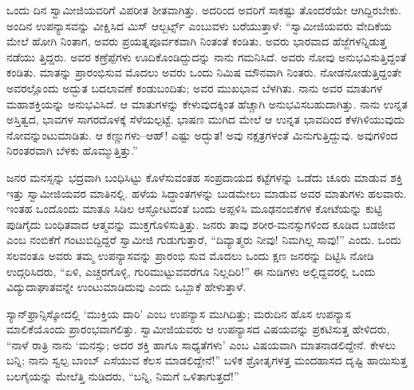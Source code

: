 ಒಂದು ದಿನ ಸ್ವಾಮೀಜಿಯವರಿಗೆ ವಿಪರೀತ ಶೀತವಾಗಿತ್ತು. ಅದರಿಂದ ಅವರಿಗೆ ಸಾಕಷ್ಟು ತೊಂದರೆಯೇ ಆಗಿದ್ದಿರಬೇಕು. ಅಂದಿನ ಉಪನ್ಯಾಸವನ್ನು ವೀಕ್ಷಿಸಿದ ಮಿಸ್ ಆಲ್ಬರ್ಟ್ಸ್ ಎಂಬುವಳು ಬರೆಯುತ್ತಾಳೆ: “ಸ್ವಾಮೀಜಿಯವರು ವೇದಿಕೆಯ ಮೇಲೆ ಹೋಗಿ ನಿಂತಾಗ, ಅವರು ಪ್ರಯತ್ನಪೂರ್ವಕವಾಗಿ ನಿಂತಂತೆ ಕಂಡಿತು. ಅವರು ಭಾರವಾದ ಹೆಜ್ಜೆಗಳನ್ನಿಡುತ್ತ ನಡೆಯು ತ್ತಿದ್ದರು. ಅವರ ಕಣ್ರೆಪ್ಪೆಗಳು ಊದಿಕೊಂಡಿದ್ದುದನ್ನು ನಾನು ಗಮನಿಸಿದೆ. ಅವರು ನೋವು ಅನುಭವಿಸುತ್ತಿದ್ದಂತೆ ಕಂಡಿತು. ಮಾತನ್ನು ಪ್ರಾರಂಭಿಸುವ ಮೊದಲು ಅವರು ಒಂದು ನಿಮಿಷ ಮೌನವಾಗಿ ನಿಂತರು. ನೋಡನೋಡುತ್ತಿದ್ದಂತೇ ಅವರಲ್ಲೊಂದು ಅದ್ಭುತ ಬದಲಾವಣೆ ಕಂಡುಬಂದಿತು; ಅವರ ಮುಖಭಾವ ಬೆಳಗಿತು. ನಾನು ಅವರ ಮಾತುಗಳ ಮಹಾಶಕ್ತಿಯನ್ನು ಅನುಭವಿಸಿದೆ. ಆ ಮಾತುಗಳನ್ನು ಕೇಳುವುದಕ್ಕಿಂತ ಹೆಚ್ಚಾಗಿ ಅನುಭವಿಸಬಹುದಾಗಿತ್ತು. ನಾನು ಉನ್ನತ ಅಸ್ತಿತ್ವದ, ಭಾವಗಳ ಸಾಗರದೊಳಕ್ಕೆ ಸೆಳೆಯಲ್ಪಟ್ಟೆ. ಭಾಷಣ ಮುಗಿದ ಮೇಲೆ ಆ ಉನ್ನತ ಭಾವದಿಂದ ಕೆಳಗಿಳಿಯುವುದು ನೋವನ್ನುಂಟುಮಾಡಿತು. ಆ ಕಣ್ಣುಗಳು–ಆಹ್! ಎಷ್ಟು ಅದ್ಭುತ! ಅವು ನಕ್ಷತ್ರಗಳಂತೆ ಮಿನುಗುತ್ತಿದ್ದುವು. ಅವುಗಳಿಂದ ನಿರಂತರವಾಗಿ ಬೆಳಕು ಹೊಮ್ಮುತ್ತಿತ್ತು.”

ಜನರ ಮನಸ್ಸನ್ನು ಭದ್ರವಾಗಿ ಬಂಧಿಸಿಟ್ಟು ಕೊಳೆಸುವಂತಹ ಸಂಪ್ರದಾಯದ ಕಟ್ಟೆಗಳನ್ನು ಒಡೆದು ಚೂರು ಮಾಡುವ ಶಕ್ತಿ ಇತ್ತು ಸ್ವಾಮೀಜಿಯವರ ಮಾತಿನಲ್ಲಿ. ಹಳೆಯ ಸಿದ್ಧಾಂತಗಳನ್ನು ಬುಡಮೇಲು ಮಾಡುವ ಅವರ ಮಾತುಗಳು ಹಲವಾರು. ಇಂತಹ ಒಂದೊಂದು ಮಾತೂ ಸಿಡಿಲ ಆಸ್ಫೋಟದಂತೆ ಬಂದು ಅಪ್ಪಳಿಸಿ ಮೂಢನಂಬಿಕೆಗಳ ಕೋಟೆಯನ್ನು ಕುಟ್ಟಿ ಪುಡಿಗೈದು ಬಂಧಿತವಾದ ಆತ್ಮವನ್ನು ಮುಕ್ತಗೊಳಿಸುತ್ತಿತ್ತು. ಜನರು ತಾವು ಶರೀರ-ಮನಸ್ಸುಗಳಿಂದ ಕೂಡಿದ ಬಡಜೀವ ಎಂಬ ನಂಬಿಕೆಗೆ ಗಂಟುಬಿದ್ದಿದ್ದರೆ ಸ್ವಾಮೀಜಿ ಗುಡುಗುತ್ತಾರೆ, “ದಿವ್ಯಾತ್ಮರು ನೀವು! ನಿಮಗಿಲ್ಲ ಸಾವು!” ಎಂದು. ಒಂದು ಸಲವಂತೂ ಅವರು ತಮ್ಮ ಉಪನ್ಯಾಸವನ್ನು ಪ್ರಾರಂಭಿ ಸುವ ಮೊದಲು ಒಂದು ಕ್ಷಣ ಜನರನ್ನು ದಿಟ್ಟಿಸಿ ನೋಡಿ ಉದ್ಗರಿಸಿದರು, “ಏಳಿ, ಎಚ್ಚರಗೊಳ್ಳಿ, ಗುರಿಮುಟ್ಟುವವರೆಗೂ ನಿಲ್ಲದಿರಿ!” ಈ ನುಡಿಗಳು ಅಲ್ಲಿದ್ದವರಲ್ಲಿ ಒಂದು ವಿದ್ಯುದಾಘಾತವನ್ನೇ ಉಂಟುಮಾಡಿದುವು ಎಂದು ಒಬ್ಬಾಕೆ ಹೇಳುತ್ತಾಳೆ.

ಸ್ಯಾನ್​ಫ್ರಾನ್ಸಿಸ್ಕೋದಲ್ಲಿ ‘ಮುಕ್ತಿಯ ದಾರಿ’ ಎಂಬ ಉಪನ್ಯಾಸ ಮುಗಿದಿತ್ತು; ಮರುದಿನ ಹೊಸ ಉಪನ್ಯಾಸ ಮಾಲಿಕೆಯೊಂದು ಪ್ರಾರಂಭವಾಗಲಿತ್ತು. ಸ್ವಾಮೀಜಿಯವರು ಆ ಉಪನ್ಯಾಸದ ವಿಷಯವನ್ನು ಪ್ರಕಟಿಸುತ್ತ ಹೇಳಿದರು, “ನಾಳೆ ರಾತ್ರಿ ನಾನು ‘ಮನಸ್ಸು; ಅದರ ಶಕ್ತಿ ಹಾಗೂ ಸಾಧ್ಯತೆಗಳು’ ಎಂಬ ವಿಷಯವಾಗಿ ಮಾತನಾಡಲಿದ್ದೇನೆ. ಕೇಳಲು ಬನ್ನಿ; ನಾನು ಸ್ವಲ್ಪ ಬಾಂಬ್ ಎಸೆಯುವ ಕೆಲಸ ಮಾಡಲಿದ್ದೇನೆ!” ಬಳಿಕ ಶ್ರೋತೃಗಳತ್ತ ಮಂದಹಾಸದ ದೃಷ್ಟಿ ಹಾಯಿಸುತ್ತ ಬಲಗೈಯನ್ನು ಮೇಲೆತ್ತಿ ನುಡಿದರು, “ಬನ್ನಿ, ನಿಮಗೆ ಒಳಿತಾಗುತ್ತದೆ!”

